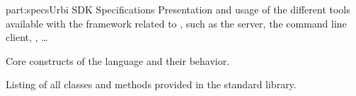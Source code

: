 \begin{partDescription}{part:specs}{Urbi SDK Specifications}
%
  Presentation and usage of the different tools available with the
  \urbi framework related to \us, such as the \urbi server, the
  command line client, \umake, \ldots

%
  Core constructs of the language and their behavior.

%
  Listing of all classes and methods provided in the standard library.

\end{partDescription}




